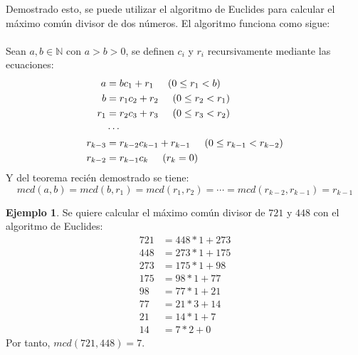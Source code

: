\documentclass[a4paper, openright, 11pt, titlepage]{report}
\theoremstyle{definition}\newtheorem{defin}[propo]{Definition}
\theoremstyle{definition}\newtheorem{obser}[propo]{Remark}
\theoremstyle{definition}\newtheorem{ejem}[propo]{Ejemplo}
\theoremstyle{definition}\newtheorem{algoritmo}[propo]{Algoritmo}
\begin{document}
Demostrado esto, se puede utilizar el algoritmo de Euclides para calcular el máximo común divisor de dos números. El algoritmo funciona como sigue:\\\\
Sean $a, b \in \mathbb{N}$ con $a>b>0$, se definen $c_{i}$ y $r_{i}$ recursivamente mediante las ecuaciones:
\begin{align*}
    a & = bc_{1} + r_{1} \hspace{0.5cm} (0 \leq r_{1} < b)\\
    b & = r_{1}c_{2} + r_{2} \hspace{0.5cm} (0 \leq r_{2} < r_{1})\\
    r_{1} & = r_{2}c_{3} + r_{3} \hspace{0.5cm} (0 \leq r_{3} < r_{2})\\
    &\cdots\\
    r_{k-3} & = r_{k-2}c_{k-1} + r_{k-1} \hspace{0.5cm} (0 \leq r_{k-1} < r_{k-2})\\
    r_{k-2} & = r_{k-1}c_{k} \hspace{0.5cm} (r_{k} = 0)
\end{align*}
Y del teorema recién demostrado se tiene:
$$mcd(a,b) = mcd(b, r_{1}) = mcd(r_{1}, r_{2}) = \cdots = mcd(r_{k-2}, r_{k-1}) = r_{k-1}$$
\begin{ejem}
Se quiere calcular el máximo común divisor de $721$ y $448$ con el algoritmo de Euclides:
\begin{align*}
    721 &= 448 * 1 + 273\\
    448 &= 273*1 + 175\\
    273 &= 175*1 + 98\\
    175 &= 98*1 + 77\\
    98 &= 77*1 + 21\\
    77 &= 21*3 + 14\\
    21 &= 14*1 + \boxed{7}\\
    14 &= 7*2 + 0
\end{align*}
Por tanto, $mcd(721, 448) = 7$.
\end{ejem}
\end{document}
